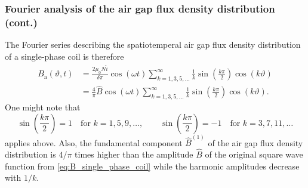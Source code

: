 \begin{frame}
	\frametitle{Fourier analysis of the air gap flux density distribution (cont.)}
        The Fourier series describing the spatiotemperal air gap flux density distribution of a single-phase coil is therefore
    \begin{equation}
        \begin{split}
            B_\mathrm{a}(\vartheta, t) &= \frac{2 \mu_0 N \hat{i}}{\delta \pi}\cos(\omega t)\sum_{k=1,3,5,\ldots}^{\infty}   \frac{1}{k}\sin(\frac{k \pi}{2}) \cos(k \vartheta)\\ &= \frac{4}{\pi} \hat{B} \cos(\omega t)\sum_{k=1,3,5,\ldots}^{\infty}   \frac{1}{k}\sin(\frac{k \pi}{2}) \cos(k \vartheta).
        \end{split}
    \end{equation}
    One might note that $$\sin(\frac{k \pi}{2}) = 1 \quad \mbox{for } k=1,5,9,\ldots, \qquad \sin(\frac{k \pi}{2}) = -1 \quad \mbox{for } k=3,7,11,\ldots$$ applies above.  Also, the fundamental component $\hat{B}^{(1)}$ of the air gap flux density distribution is $4/\pi$ times higher than the amplitude $\hat{B}$ of the original square wave function from \eqref{eq:B_single_phase_coil} while the harmonic amplitudes decrease with $1/k$. 
\end{frame}

